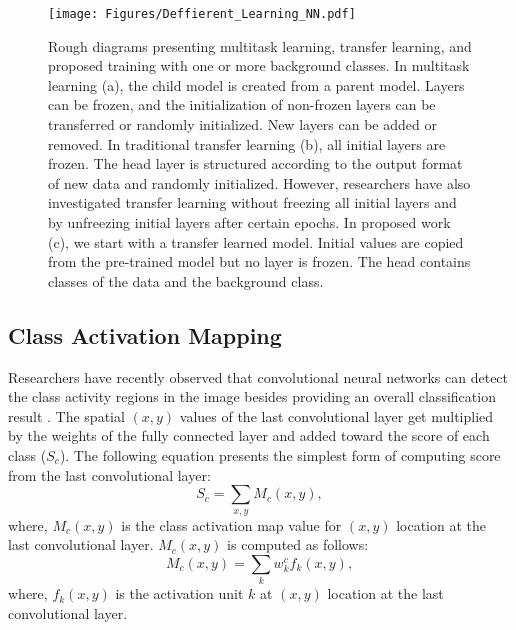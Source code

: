 \documentclass{article}
\begin{document}
\begin{figure*}[ht]
\vskip 0.2in
\begin{center}
\centerline{\texttt{[image: Figures/Deffierent\_Learning\_NN.pdf]}}
\caption{Rough diagrams presenting multitask learning, transfer learning, and proposed training with one or more background classes. In multitask learning (a), the child model is created from a parent model. Layers can be frozen, and the initialization of non-frozen layers can be transferred or randomly initialized. New layers can be added or removed. In traditional transfer learning (b), all initial layers are frozen. The head layer is structured according to the output format of new data and randomly initialized. However, researchers have also investigated transfer learning without freezing all initial layers and by unfreezing initial layers after certain epochs. In proposed work (c), we start with a transfer learned model. Initial values are copied from the pre-trained model but no layer is frozen. The head contains classes of the data and the background class.  }
\label{Chart}
\end{center}
\vskip -0.2in
\end{figure*}



\subsection{Class Activation Mapping}
Researchers have recently observed that convolutional neural networks can detect the class activity regions in the image besides providing an overall classification result \cite{zhou2016learning}. The spatial $(x,y)$ values of the last convolutional layer get multiplied by the weights of the fully connected layer and added toward the score of each class ($S_c$). The following equation presents the simplest form of computing score from the last convolutional layer: 
\begin{equation}
S_c = \sum_{x,y} M_c (x,y),
        \label{CAM1}
\end{equation}
where, $M_c(x,y)$ is the class activation map value for $(x,y)$ location at the last convolutional layer. $M_c(x,y)$ is computed as follows:
\begin{equation}
M_c (x,y) = \sum_{k} w_k^c f_k (x,y),
        \label{CAM2}
\end{equation}
where, $f_k (x,y)$ is the activation unit $k$ at $(x,y)$ location at the last convolutional layer.
\end{document}
